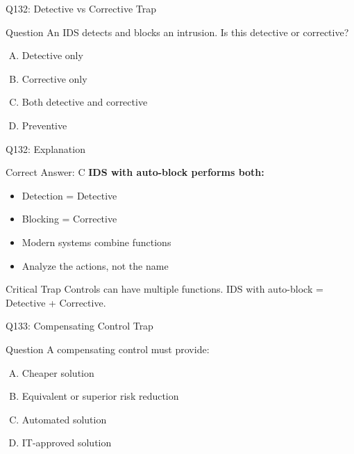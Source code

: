 \documentclass{beamer}
\begin{document}
	\begin{frame}{Q132: Detective vs Corrective Trap}
		\begin{block}{Question}
			An IDS detects and blocks an intrusion. Is this detective or corrective?
		\end{block}
		\begin{enumerate}[(A)]
			\item Detective only
			\item Corrective only
			\item Both detective and corrective
			\item Preventive
		\end{enumerate}
	\end{frame}
	
	\begin{frame}{Q132: Explanation}
		\begin{block}{Correct Answer: C}
			\textbf{IDS with auto-block performs both:}
			\begin{itemize}
				\item Detection = Detective
				\item Blocking = Corrective
				\item Modern systems combine functions
				\item Analyze the actions, not the name
			\end{itemize}
		\end{block}
		\begin{alertblock}{Critical Trap}
			Controls can have multiple functions.
			IDS with auto-block = Detective + Corrective.
		\end{alertblock}
	\end{frame}
	
	\begin{frame}{Q133: Compensating Control Trap}
		\begin{block}{Question}
			A compensating control must provide:
		\end{block}
		\begin{enumerate}[(A)]
			\item Cheaper solution
			\item Equivalent or superior risk reduction
			\item Automated solution
			\item IT-approved solution
		\end{enumerate}
	\end{frame}
	
\end{document}
